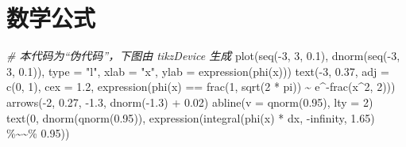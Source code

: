 \documentclass[
  b5paper,
  UTF8,twoside]{book}
\newenvironment{Shaded}{\begin{snugshade}}{\end{snugshade}}
\newcommand{\AttributeTok}[1]{\textcolor[rgb]{0.77,0.63,0.00}{#1}}
\newcommand{\CommentTok}[1]{\textcolor[rgb]{0.56,0.35,0.01}{\textit{#1}}}
\newcommand{\DecValTok}[1]{\textcolor[rgb]{0.00,0.00,0.81}{#1}}
\newcommand{\FloatTok}[1]{\textcolor[rgb]{0.00,0.00,0.81}{#1}}
\newcommand{\FunctionTok}[1]{\textcolor[rgb]{0.00,0.00,0.00}{#1}}
\newcommand{\NormalTok}[1]{#1}
\newcommand{\SpecialCharTok}[1]{\textcolor[rgb]{0.00,0.00,0.00}{#1}}
\newcommand{\StringTok}[1]{\textcolor[rgb]{0.31,0.60,0.02}{#1}}
\begin{document}
\hypertarget{sec:plotmath}{%
\section{数学公式}\label{sec:plotmath}}

\begin{Shaded}
\begin{Highlighting}[]
\CommentTok{\# 本代码为“伪代码”，下图由 tikzDevice 生成}
\FunctionTok{plot}\NormalTok{(}\FunctionTok{seq}\NormalTok{(}\SpecialCharTok{{-}}\DecValTok{3}\NormalTok{, }\DecValTok{3}\NormalTok{, }\FloatTok{0.1}\NormalTok{), }\FunctionTok{dnorm}\NormalTok{(}\FunctionTok{seq}\NormalTok{(}\SpecialCharTok{{-}}\DecValTok{3}\NormalTok{, }\DecValTok{3}\NormalTok{, }\FloatTok{0.1}\NormalTok{)), }\AttributeTok{type =} \StringTok{"l"}\NormalTok{, }\AttributeTok{xlab =} \StringTok{"x"}\NormalTok{, }\AttributeTok{ylab =} \FunctionTok{expression}\NormalTok{(}\FunctionTok{phi}\NormalTok{(x)))}
\FunctionTok{text}\NormalTok{(}\SpecialCharTok{{-}}\DecValTok{3}\NormalTok{, }\FloatTok{0.37}\NormalTok{, }\AttributeTok{adj =} \FunctionTok{c}\NormalTok{(}\DecValTok{0}\NormalTok{, }\DecValTok{1}\NormalTok{), }\AttributeTok{cex =} \FloatTok{1.2}\NormalTok{, }
     \FunctionTok{expression}\NormalTok{(}\FunctionTok{phi}\NormalTok{(x) }\SpecialCharTok{==} \FunctionTok{frac}\NormalTok{(}\DecValTok{1}\NormalTok{, }\FunctionTok{sqrt}\NormalTok{(}\DecValTok{2} \SpecialCharTok{*}\NormalTok{ pi)) }\SpecialCharTok{\textasciitilde{}}\NormalTok{ e}\SpecialCharTok{\^{}{-}}\FunctionTok{frac}\NormalTok{(x}\SpecialCharTok{\^{}}\DecValTok{2}\NormalTok{, }\DecValTok{2}\NormalTok{)))}
\FunctionTok{arrows}\NormalTok{(}\SpecialCharTok{{-}}\DecValTok{2}\NormalTok{, }\FloatTok{0.27}\NormalTok{, }\SpecialCharTok{{-}}\FloatTok{1.3}\NormalTok{, }\FunctionTok{dnorm}\NormalTok{(}\SpecialCharTok{{-}}\FloatTok{1.3}\NormalTok{) }\SpecialCharTok{+} \FloatTok{0.02}\NormalTok{)}
\FunctionTok{abline}\NormalTok{(}\AttributeTok{v =} \FunctionTok{qnorm}\NormalTok{(}\FloatTok{0.95}\NormalTok{), }\AttributeTok{lty =} \DecValTok{2}\NormalTok{)}
\FunctionTok{text}\NormalTok{(}\DecValTok{0}\NormalTok{, }\FunctionTok{dnorm}\NormalTok{(}\FunctionTok{qnorm}\NormalTok{(}\FloatTok{0.95}\NormalTok{)), }\FunctionTok{expression}\NormalTok{(}\FunctionTok{integral}\NormalTok{(}\FunctionTok{phi}\NormalTok{(x) }\SpecialCharTok{*}\NormalTok{ dx, }\SpecialCharTok{{-}}\NormalTok{infinity, }\FloatTok{1.65}\NormalTok{) }\SpecialCharTok{\%\textasciitilde{}\textasciitilde{}\%} \FloatTok{0.95}\NormalTok{))}
\end{Highlighting}
\end{Shaded}
\end{document}
